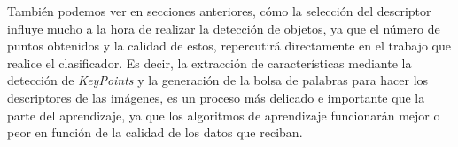 \documentclass[paper=a4, fontsize=11pt]{article} %
\numberwithin{equation}{section} %
\numberwithin{figure}{section} %
\numberwithin{table}{section} %
\begin{document}
También podemos ver en secciones anteriores, cómo la selección del descriptor influye mucho a la hora de realizar la detección de objetos, ya que el número de puntos obtenidos y la calidad de estos, repercutirá directamente en el trabajo que realice el clasificador. Es decir, la extracción de características mediante la detección de \textit{KeyPoints} y la generación de la bolsa de palabras para hacer los descriptores de las imágenes, es un proceso más delicado e importante que la parte del aprendizaje, ya que los algoritmos de aprendizaje funcionarán mejor o peor en función de la calidad de los datos que reciban.

\end{document}
